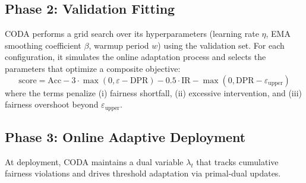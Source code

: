 \documentclass[10pt,twocolumn]{article}
\theoremstyle{definition}
\begin{document}
\subsection{Phase 2: Validation Fitting}
CODA performs a grid search over its hyperparameters (learning rate $\eta$, EMA smoothing coefficient $\beta$, warmup period $w$) using the validation set. For each configuration, it simulates the online adaptation process and selects the parameters that optimize a composite objective:
\begin{equation}
\text{score} = \text{Acc} - 3 \cdot \max(0, \varepsilon{-}\text{DPR}) - 0.5 \cdot \text{IR} - \max(0, \text{DPR}{-}\varepsilon_{\text{upper}})
\label{eq:gridsearch}
\end{equation}
where the terms penalize (i) fairness shortfall, (ii) excessive intervention, and (iii) fairness overshoot beyond $\varepsilon_{\text{upper}}$.

\subsection{Phase 3: Online Adaptive Deployment}

At deployment, CODA maintains a dual variable $\lambda_t$ that tracks cumulative fairness violations and drives threshold adaptation via primal-dual updates.
\end{document}
